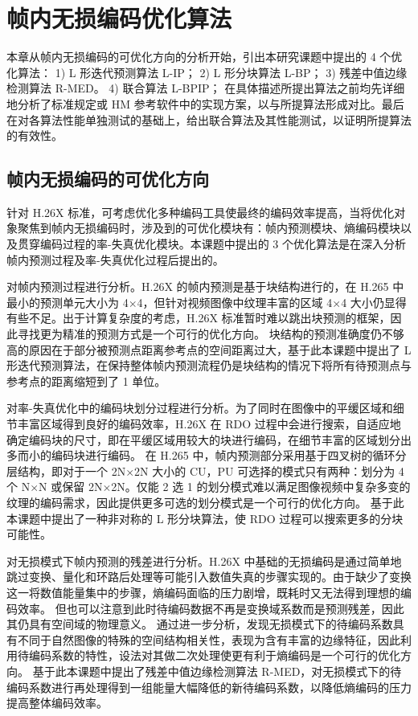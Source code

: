 \chapter{帧内无损编码优化算法}
\label{cha:c3}
本章从帧内无损编码的可优化方向的分析开始，引出本研究课题中提出的 4 个优化算法：
1) L 形迭代预测算法 L-IP；
2) L 形分块算法 L-BP；
3) 残差中值边缘检测算法 R-MED。
4) 联合算法 L-BPIP；
在具体描述所提出算法之前均先详细地分析了标准规定或 HM 参考软件中的实现方案，以与所提算法形成对比。最后在对各算法性能单独测试的基础上，给出联合算法及其性能测试，以证明所提算法的有效性。

\section{帧内无损编码的可优化方向}
针对 H.26X 标准，可考虑优化多种编码工具使最终的编码效率提高，当将优化对象聚焦到帧内无损编码时，涉及到的可优化模块有：帧内预测模块、熵编码模块以及贯穿编码过程的率-失真优化模块。本课题中提出的 3 个优化算法是在深入分析帧内预测过程及率-失真优化过程后提出的。

对帧内预测过程进行分析。H.26X 的帧内预测是基于块结构进行的，在 H.265 中最小的预测单元大小为 4$\times$4，但针对视频图像中纹理丰富的区域 4$\times$4 大小仍显得有些不足。出于计算复杂度的考虑，H.26X 标准暂时难以跳出块预测的框架，因此寻找更为精准的预测方式是一个可行的优化方向。
块结构的预测准确度仍不够高的原因在于部分被预测点距离参考点的空间距离过大，基于此本课题中提出了 L 形迭代预测算法，在保持整体帧内预测流程仍是块结构的情况下将所有待预测点与参考点的距离缩短到了 1 单位。

对率-失真优化中的编码块划分过程进行分析。为了同时在图像中的平缓区域和细节丰富区域得到良好的编码效率，H.26X 在 RDO 过程中会进行搜索，自适应地确定编码块的尺寸，即在平缓区域用较大的块进行编码，在细节丰富的区域划分出多而小的编码块进行编码。
在 H.265 中，帧内预测部分采用基于四叉树的循环分层结构，即对于一个 2N$\times$2N 大小的 CU，PU 可选择的模式只有两种：划分为 4 个 N$\times$N 或保留 2N$\times$2N。仅能 2 选 1 的划分模式难以满足图像视频中复杂多变的纹理的编码需求，因此提供更多可选的划分模式是一个可行的优化方向。
基于此本课题中提出了一种非对称的 L 形分块算法，使 RDO 过程可以搜索更多的分块可能性。

对无损模式下帧内预测的残差进行分析。H.26X 中基础的无损编码是通过简单地跳过变换、量化和环路后处理等可能引入数值失真的步骤实现的。由于缺少了变换这一将数值能量集中的步骤，熵编码面临的压力剧增，既耗时又无法得到理想的编码效率。
但也可以注意到此时待编码数据不再是变换域系数而是预测残差，因此其仍具有空间域的物理意义。
通过进一步分析，发现无损模式下的待编码系数具有不同于自然图像的特殊的空间结构相关性，表现为含有丰富的边缘特征，因此利用待编码系数的特性，设法对其做二次处理使更有利于熵编码是一个可行的优化方向。
基于此本课题中提出了残差中值边缘检测算法 R-MED，对无损模式下的待编码系数进行再处理得到一组能量大幅降低的新待编码系数，以降低熵编码的压力提高整体编码效率。

